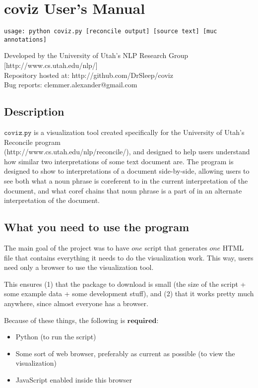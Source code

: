 \documentclass[a4paper]{article}
\begin{document}
\section*{coviz User's Manual}
\begin{verbatim}
usage: python coviz.py [reconcile output] [source text] [muc annotations]
\end{verbatim}

\noindent Developed by the University of Utah's NLP Research Group [http://www.cs.utah.edu/nlp/] \\
\noindent Repository hosted at: http://github.com/DrSleep/coviz \\
\noindent Bug reports: clemmer.alexander@gmail.com

\subsection*{Description}
$\texttt{coviz.py}$ is a visualization tool created specifically for the University of Utah's Reconcile program \\
(http://www.cs.utah.edu/nlp/reconcile/), and designed to help users understand how similar two interpretations of some text document are. The program is designed to show to interpretations of a document side-by-side, allowing users to see both what a noun phrase is coreferent to in the current interpretation of the document, and what coref chains that noun phrase is a part of in an alternate interpretation of the document.

\subsection*{What you need to use the program}

The main goal of the project was to have $\textit{one}$ script that generates $\textit{one}$ HTML file that contains everything it needs to do the visualization work. This way, users need only a browser to use the visualization tool.

This ensures (1) that the package to download is small (the size of the script + some example data + some development stuff), and (2) that it works pretty much anywhere, since almost everyone has a browser.

Because of these things, the following is $\textbf{required}$:

\begin{itemize}
\item Python (to run the script)
\item Some sort of web browser, preferably as current as possible (to view the visualization)
\item JavaScript enabled inside this browser
\end{itemize}
\end{document}
